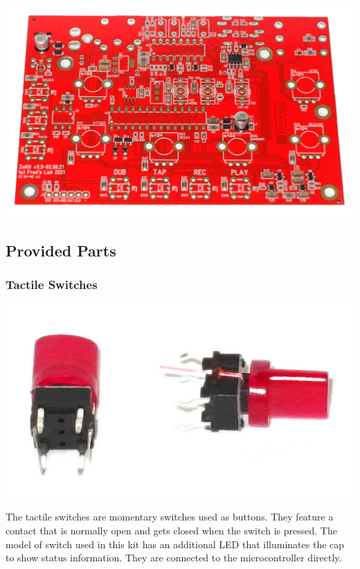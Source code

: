 \documentclass{scrartcl}
\begin{document}
\begin{center}
\includegraphics[scale=0.10]{assets/zekit-unassembled.jpg}
\end{center}

\subsection{Provided Parts}

\subsubsection{Tactile Switches}

\begin{center}
    \includegraphics[scale=0.20]{assets/zekit-tacts.jpg}
\end{center}

The tactile switches are momentary switches used as buttons. They feature a contact that is normally open and gets closed when the switch is pressed. The model of switch used in this kit has an additional LED that illuminates the cap to show status information. They are connected to the microcontroller directly.
\end{document}
